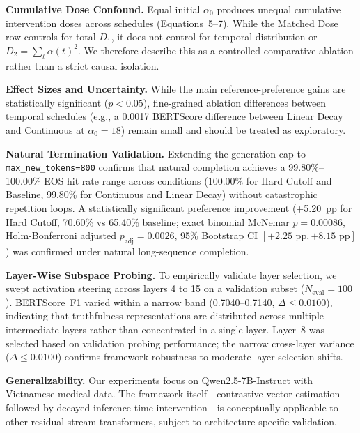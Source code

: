 \documentclass[conference]{IEEEtran}
\begin{document}
\textbf{Cumulative Dose Confound.} Equal initial $\alpha_0$ produces unequal cumulative intervention doses across schedules (Equations~5--7). While the Matched Dose row controls for total $D_1$, it does not control for temporal distribution or $D_2 = \sum_t \alpha(t)^2$. We therefore describe this as a controlled comparative ablation rather than a strict causal isolation.

\textbf{Effect Sizes and Uncertainty.} While the main reference-preference gains are statistically significant ($p < 0.05$), fine-grained ablation differences between temporal schedules (e.g., a 0.0017 BERTScore difference between Linear Decay and Continuous at $\alpha_0=18$) remain small and should be treated as exploratory.

\textbf{Natural Termination Validation.} Extending the generation cap to \texttt{max\_new\_tokens=800} confirms that natural completion achieves a 99.80\%--100.00\% EOS hit rate range across conditions (100.00\% for Hard Cutoff and Baseline, 99.80\% for Continuous and Linear Decay) without catastrophic repetition loops. A statistically significant preference improvement (+5.20~pp for Hard Cutoff, 70.60\% vs 65.40\% baseline; exact binomial McNemar $p=0.00086$, Holm-Bonferroni adjusted $p_{\text{adj}}=0.0026$, 95\% Bootstrap CI $[+2.25\text{ pp}, +8.15\text{ pp}]$) was confirmed under natural long-sequence completion.

\textbf{Layer-Wise Subspace Probing.} To empirically validate layer selection, we swept activation steering across layers 4 to 15 on a validation subset ($N_{\text{eval}}=100$). BERTScore~F1 varied within a narrow band (0.7040--0.7140, $\Delta \le 0.0100$), indicating that truthfulness representations are distributed across multiple intermediate layers rather than concentrated in a single layer. Layer~8 was selected based on validation probing performance; the narrow cross-layer variance ($\Delta \le 0.0100$) confirms framework robustness to moderate layer selection shifts.

\textbf{Generalizability.} Our experiments focus on Qwen2.5-7B-Instruct with Vietnamese medical data. The framework itself---contrastive vector estimation followed by decayed inference-time intervention---is conceptually applicable to other residual-stream transformers, subject to architecture-specific validation.
\end{document}
